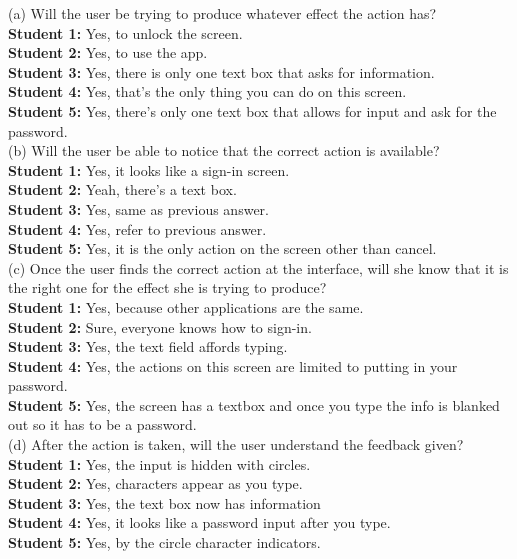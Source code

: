 \documentclass[pdftex,12pt,a4paper]{report}
\begin{document}
\noindent(a) Will the user be trying to produce whatever effect the action has?
\\\indent \textbf{Student 1:} Yes, to unlock the screen.
\\\indent \textbf{Student 2:} Yes, to use the app.
\\\indent \textbf{Student 3:} Yes, there is only one text box that asks for information.
\\\indent \textbf{Student 4:} Yes, that's the only thing you can do on this screen.
\\\indent \textbf{Student 5:} Yes, there's only one text box that allows for input and ask for the password.
\\(b) Will the user be able to notice that the correct action is available?
\\\indent \textbf{Student 1:} Yes, it looks like a sign-in screen.
\\\indent \textbf{Student 2:} Yeah, there's a text box.
\\\indent \textbf{Student 3:} Yes, same as previous answer.
\\\indent \textbf{Student 4:} Yes, refer to previous answer.
\\\indent \textbf{Student 5:} Yes, it is the only action on the screen other than cancel.
\\(c) Once the user finds the correct action at the interface, will she know that it is the right one for the effect she is trying to produce?
\\\indent \textbf{Student 1:} Yes, because other applications are the same.
\\\indent \textbf{Student 2:} Sure, everyone knows how to sign-in.
\\\indent \textbf{Student 3:} Yes, the text field affords typing.
\\\indent \textbf{Student 4:} Yes, the actions on this screen are limited to putting in your password.
\\\indent \textbf{Student 5:} Yes, the screen has a textbox and once you type the info is blanked out so it has to be a password.
\\(d) After the action is taken, will the user understand the feedback given?
\\\indent \textbf{Student 1:} Yes, the input is hidden with circles.
\\\indent \textbf{Student 2:} Yes, characters appear as you type.
\\\indent \textbf{Student 3:} Yes, the text box now has information
\\\indent \textbf{Student 4:} Yes, it looks like a password input after you type.
\\\indent \textbf{Student 5:} Yes, by the circle character indicators.
\end{document}
